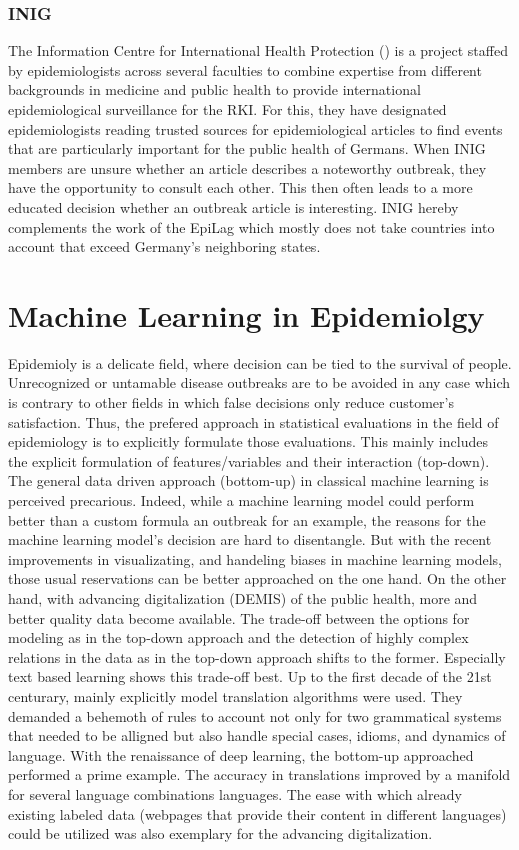 \subsubsection{INIG}
The Information Centre for International Health Protection () is a project staffed by epidemiologists across several faculties to combine expertise from different backgrounds in medicine and public health to provide international epidemiological surveillance for the RKI. For this, they have designated epidemiologists reading trusted sources for epidemiological articles to find events that are particularly important for the public health of Germans. When INIG members are unsure whether an article describes a noteworthy outbreak, they have the opportunity to consult each other. This then often leads to a more educated decision whether an outbreak article is interesting. INIG hereby complements the work of the EpiLag which mostly does not take countries into account that exceed Germany's neighboring states.

\section{Machine Learning in Epidemiolgy}
Epidemioly is a delicate field, where decision can be tied to the survival of people. Unrecognized or untamable disease outbreaks are to be avoided in any case which is contrary to other fields in which false decisions only reduce customer's satisfaction. Thus, the prefered approach in statistical evaluations in the field of epidemiology is to explicitly formulate those evaluations. This mainly includes the explicit formulation of features/variables and their interaction (top-down). The general data driven approach (bottom-up) in classical machine learning is perceived precarious. Indeed, while a machine learning model could perform better than a custom formula an outbreak for an example, the reasons for the machine learning model's decision are hard to disentangle. But with the recent improvements in visualizating, and handeling biases in machine learning models, those usual reservations can be better approached on the one hand. On the other hand, with advancing digitalization (DEMIS) of the public health, more and better quality data become available. The trade-off between the options for modeling as in the top-down approach and the detection of highly complex relations in the data as in the top-down approach shifts to the former. Especially text based learning shows this trade-off best. Up to the first decade of the 21st centurary, mainly explicitly model translation algorithms were used. They demanded a behemoth of rules to account not only for two grammatical systems that needed to be alligned but also handle special cases, idioms, and dynamics of language. With the renaissance of deep learning, the bottom-up approached performed a prime example. The accuracy in translations improved by a manifold for several language combinations languages. The ease with which already existing labeled data (webpages that provide their content in different languages) could be utilized was also exemplary for the advancing digitalization.



